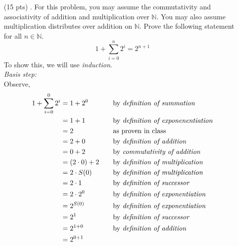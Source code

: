 \documentclass[11pt,a4paper]{article}
\begin{document}
\begin{enumerate}
    \item[(15 pts) \quad 5.]
    For this problem, you may assume the commutativity and associativity of addition and multiplication over $\mathbb{N} $. You may also assume 
    multiplication distributes over addition on $\mathbb{N}$. Prove the following 
    statement for all $n \in \mathbb{N} $.
    \begin{equation*}
        1 + \sum_{i = 0}^{n} 2^i = 2^{n + 1}
    \end{equation*}
    To show this, we will use \emph{induction}. \\
    \emph{Basis step:} \\
    Observe,
    \begin{align*}
        1 + \sum_{i = 0}^{0} 2^i
            &= 1 + 2^0
                &\quad
                &\text{by \emph{definition of summation}} \\
            &= 1 + 1
                &\quad
                &\text{by \emph{definition of exponenentiation}} \\
            &= 2
                &\quad
                &\text{as proven in class} \\
            &= 2 + 0
                &\quad
                &\text{by \emph{definition of addition}} \\
            &= 0 + 2
                &\quad
                &\text{by \emph{commutativity of addition}} \\
            &= (2 \cdot 0) + 2
                &\quad
                &\text{by \emph{definition of multiplication}} \\
            &= 2 \cdot S(0)
                &\quad
                &\text{by \emph{definition of multiplication}} \\
            &= 2 \cdot 1
                &\quad
                &\text{by \emph{definition of successor}} \\
            &= 2 \cdot 2^0
                &\quad
                &\text{by \emph{definition of exponentiation}} \\
            &= 2^{S(0)}
                &\quad
                &\text{by \emph{definition of exponentiation}} \\
            &= 2^1
                &\quad
                &\text{by \emph{definition of successor}} \\
            &= 2^{1 + 0}
                &\quad
                &\text{by \emph{definition of addition}} \\
            &= 2^{0 + 1}
                &\quad

\end{align*}
\end{enumerate}
\end{document}
